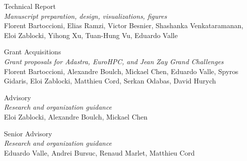{\sc Technical Report} \\
\textit{\small Manuscript preparation, design, visualizations, figures} \\
Florent Bartoccioni, Elias Ramzi, Victor Besnier, Shashanka Venkataramanan, Eloi Zablocki, Yihong Xu, Tuan-Hung Vu, Eduardo Valle

{\sc Grant Acquisitions} \\
\textit{\small Grant proposals for Adastra, EuroHPC, and Jean Zay Grand Challenges} \\
Florent Bartoccioni, Alexandre Boulch, Mickael Chen, Eduardo Valle, Spyros Gidaris, Eloi Zablocki, Matthieu Cord, Serkan Odabas, David Hurych

{\sc Advisory} \\
\textit{\small Research and organization guidance} \\
Eloi Zablocki, Alexandre Boulch, Mickael Chen

{\sc Senior Advisory} \\
\textit{\small Research and organization guidance} \\
Eduardo Valle, Andrei Bursuc, Renaud Marlet, Matthieu Cord\\
